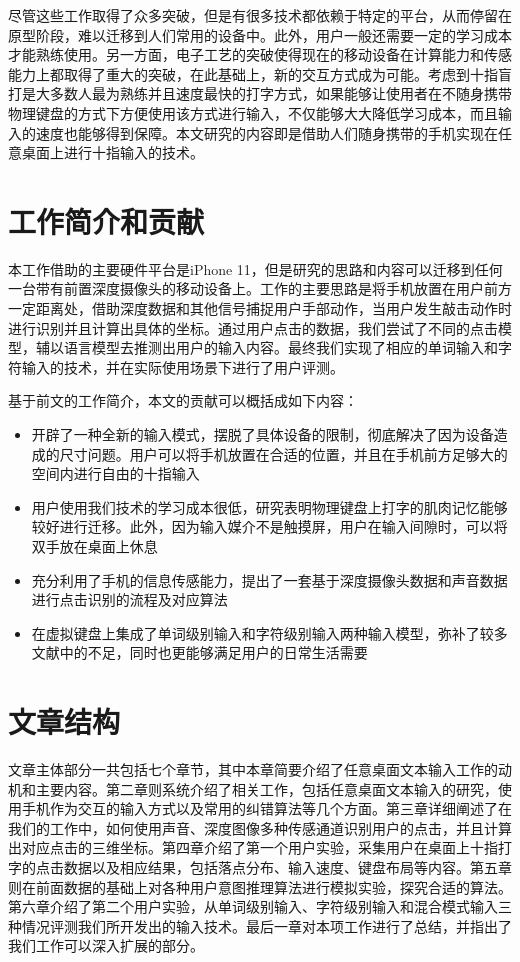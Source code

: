 尽管这些工作取得了众多突破，但是有很多技术都依赖于特定的平台，从而停留在原型阶段，难以迁移到人们常用的设备中。此外，用户一般还需要一定的学习成本才能熟练使用。另一方面，电子工艺的突破使得现在的移动设备在计算能力和传感能力上都取得了重大的突破，在此基础上，新的交互方式成为可能。考虑到十指盲打是大多数人最为熟练并且速度最快的打字方式，如果能够让使用者在不随身携带物理键盘的方式下方便使用该方式进行输入，不仅能够大大降低学习成本，而且输入的速度也能够得到保障。本文研究的内容即是借助人们随身携带的手机实现在任意桌面上进行十指输入的技术。

\section{工作简介和贡献}
本工作借助的主要硬件平台是iPhone 11，但是研究的思路和内容可以迁移到任何一台带有前置深度摄像头的移动设备上。工作的主要思路是将手机放置在用户前方一定距离处，借助深度数据和其他信号捕捉用户手部动作，当用户发生敲击动作时进行识别并且计算出具体的坐标。通过用户点击的数据，我们尝试了不同的点击模型，辅以语言模型去推测出用户的输入内容。最终我们实现了相应的单词输入和字符输入的技术，并在实际使用场景下进行了用户评测。

基于前文的工作简介，本文的贡献可以概括成如下内容：
\begin{itemize}
    \item 开辟了一种全新的输入模式，摆脱了具体设备的限制，彻底解决了因为设备造成的尺寸问题。用户可以将手机放置在合适的位置，并且在手机前方足够大的空间内进行自由的十指输入
    \item 用户使用我们技术的学习成本很低，研究表明物理键盘上打字的肌肉记忆能够较好进行迁移\cite{palmboard2020}\cite{2018shitoast}。此外，因为输入媒介不是触摸屏，用户在输入间隙时，可以将双手放在桌面上休息
    \item 充分利用了手机的信息传感能力，提出了一套基于深度摄像头数据和声音数据进行点击识别的流程及对应算法
    \item 在虚拟键盘上集成了单词级别输入和字符级别输入两种输入模型，弥补了较多文献中的不足，同时也更能够满足用户的日常生活需要
\end{itemize}

\section{文章结构}
文章主体部分一共包括七个章节，其中本章简要介绍了任意桌面文本输入工作的动机和主要内容。第二章则系统介绍了相关工作，包括任意桌面文本输入的研究，使用手机作为交互的输入方式以及常用的纠错算法等几个方面。第三章详细阐述了在我们的工作中，如何使用声音、深度图像多种传感通道识别用户的点击，并且计算出对应点击的三维坐标。第四章介绍了第一个用户实验，采集用户在桌面上十指打字的点击数据以及相应结果，包括落点分布、输入速度、键盘布局等内容。第五章则在前面数据的基础上对各种用户意图推理算法进行模拟实验，探究合适的算法。第六章介绍了第二个用户实验，从单词级别输入、字符级别输入和混合模式输入三种情况评测我们所开发出的输入技术。最后一章对本项工作进行了总结，并指出了我们工作可以深入扩展的部分。